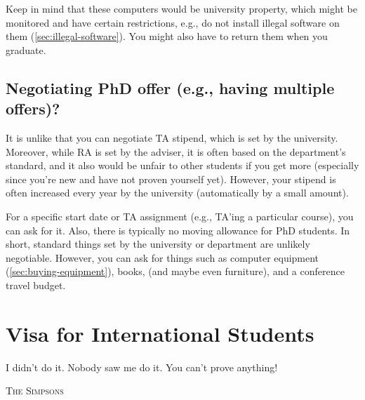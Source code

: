 \documentclass[oneside,11pt,dvipsnames]{book}
\begin{document}
Keep in mind that these computers would be university property, which might be monitored and have certain restrictions, e.g., do not install illegal software on them (\autoref{sec:illegal-software}).  You might also have to return them when you graduate. 

\section{Negotiating PhD offer (e.g., having multiple offers)?}\label{sec:negotiate}

It is unlike that you can negotiate TA stipend, which is set by the university. Moreover, while RA is set by the adviser, it is often based on the department's standard, and it also would be unfair to other students if you get more (especially since you're new and have not proven yourself yet). However, your stipend is often increased every year by the university (automatically by a small amount).

For a specific start date or TA assignment (e.g., TA'ing a particular course), you can ask for it. Also, there is typically no moving allowance for PhD students. In short, standard things set by the university or department are unlikely negotiable.  However, you can ask for things such as computer equipment (\autoref{sec:buying-equipment}), books, (and maybe even furniture), and a conference travel budget.



\appendix

\chapter{Visa for International Students}\label{sec:visa}

\epigraph{\vspace{-0.2in} I didn’t do it. Nobody saw me do it. You can’t prove anything!}{\textsc{The Simpsons}}
\end{document}
